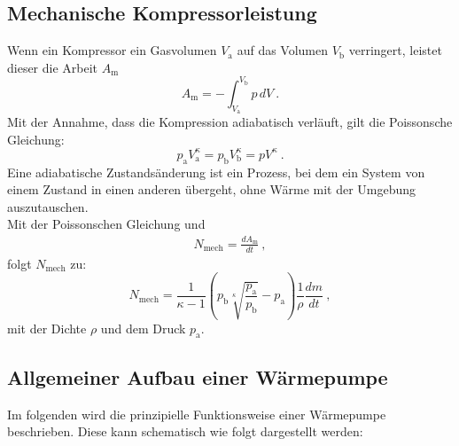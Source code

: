 \subsection{Mechanische Kompressorleistung}
Wenn ein Kompressor ein Gasvolumen $V_\text{a}$ auf das Volumen $V_\text{b}$ verringert, leistet dieser die Arbeit $A_\text{m}$
\begin{equation}
	A_\text{m} = - \int_{V_\text{a}}^{V_\text{b}} p \, dV \ .
\end{equation}
Mit der Annahme, dass die Kompression adiabatisch verläuft, gilt die Poissonsche Gleichung:
\begin{equation}
	p_\text{a} V_\text{a}^\kappa = p_\text{b} V_\text{b}^\kappa = p V^\kappa \ .
\end{equation}
Eine adiabatische Zustandsänderung ist ein Prozess, bei dem ein System von einem Zustand in einen anderen übergeht, ohne Wärme mit der Umgebung auszutauschen. \\
Mit der Poissonschen Gleichung und
\begin{align*}
	N_\text{mech} = \frac{dA_\text{m}}{dt} \ ,
\end{align*}
folgt $N_\text{mech}$ zu:
\begin{equation}
	N_\text{mech} = \frac{1}{\kappa - 1} \left(p_\text{b} \sqrt[\kappa]{\frac{p_\text{a}}{p_\text{b}}} - p_\text{a} \right) \frac{1}{\rho} \frac{dm}{dt} \ ,
\end{equation}
mit der Dichte $\rho$ und dem Druck $p_\text{a}$.

\subsection{Allgemeiner Aufbau einer Wärmepumpe}
Im folgenden wird die prinzipielle Funktionsweise einer Wärmepumpe beschrieben. Diese kann schematisch wie folgt dargestellt werden:


